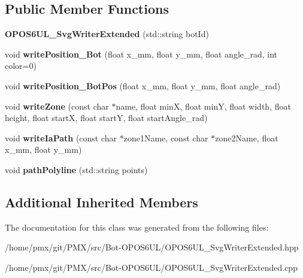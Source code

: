 \subsection*{Public Member Functions}
\begin{DoxyCompactItemize}
\item 
\mbox{\label{classOPOS6UL__SvgWriterExtended_a3ee48528831cdb47824b43a72df5cc66}} 
{\bfseries O\+P\+O\+S6\+U\+L\+\_\+\+Svg\+Writer\+Extended} (std\+::string bot\+Id)
\item 
\mbox{\label{classOPOS6UL__SvgWriterExtended_a65a0d17d68ed6d3e6e0ae729aba0b331}} 
void {\bfseries write\+Position\+\_\+\+Bot} (float x\+\_\+mm, float y\+\_\+mm, float angle\+\_\+rad, int color=0)
\item 
\mbox{\label{classOPOS6UL__SvgWriterExtended_a71b6df762de5209686945a62c88754e6}} 
void {\bfseries write\+Position\+\_\+\+Bot\+Pos} (float x\+\_\+mm, float y\+\_\+mm, float angle\+\_\+rad)
\item 
\mbox{\label{classOPOS6UL__SvgWriterExtended_a07c9d0f975a6370f2b788036fdc68727}} 
void {\bfseries write\+Zone} (const char $\ast$name, float minX, float minY, float width, float height, float startX, float startY, float start\+Angle\+\_\+rad)
\item 
\mbox{\label{classOPOS6UL__SvgWriterExtended_a207a264f4fa318a7773394db2a91e03d}} 
void {\bfseries write\+Ia\+Path} (const char $\ast$zone1\+Name, const char $\ast$zone2\+Name, float x\+\_\+mm, float y\+\_\+mm)
\item 
\mbox{\label{classOPOS6UL__SvgWriterExtended_a8c32a8f3863f7fadfff4076513524fc2}} 
void {\bfseries path\+Polyline} (std\+::string points)
\end{DoxyCompactItemize}
\subsection*{Additional Inherited Members}


The documentation for this class was generated from the following files\+:\begin{DoxyCompactItemize}
\item 
/home/pmx/git/\+P\+M\+X/src/\+Bot-\/\+O\+P\+O\+S6\+U\+L/O\+P\+O\+S6\+U\+L\+\_\+\+Svg\+Writer\+Extended.\+hpp\item 
/home/pmx/git/\+P\+M\+X/src/\+Bot-\/\+O\+P\+O\+S6\+U\+L/O\+P\+O\+S6\+U\+L\+\_\+\+Svg\+Writer\+Extended.\+cpp\end{DoxyCompactItemize}
